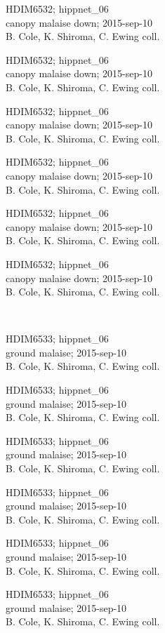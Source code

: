 \documentclass[2pt]{extarticle}
\begin{document}
\noindent
\parbox{0.16\textwidth}{\tiny \raggedright \rule[-0.3\baselineskip]{0pt}{10pt}HDIM6532; hippnet\_06\\ canopy malaise down; 2015-sep-10\\ B. Cole, K. Shiroma, C. Ewing coll.}
\parbox{0.16\textwidth}{\tiny \raggedright \rule[-0.3\baselineskip]{0pt}{10pt}HDIM6532; hippnet\_06\\ canopy malaise down; 2015-sep-10\\ B. Cole, K. Shiroma, C. Ewing coll.}
\parbox{0.16\textwidth}{\tiny \raggedright \rule[-0.3\baselineskip]{0pt}{10pt}HDIM6532; hippnet\_06\\ canopy malaise down; 2015-sep-10\\ B. Cole, K. Shiroma, C. Ewing coll.}
\parbox{0.16\textwidth}{\tiny \raggedright \rule[-0.3\baselineskip]{0pt}{10pt}HDIM6532; hippnet\_06\\ canopy malaise down; 2015-sep-10\\ B. Cole, K. Shiroma, C. Ewing coll.}
\parbox{0.16\textwidth}{\tiny \raggedright \rule[-0.3\baselineskip]{0pt}{10pt}HDIM6532; hippnet\_06\\ canopy malaise down; 2015-sep-10\\ B. Cole, K. Shiroma, C. Ewing coll.}
\parbox{0.16\textwidth}{\tiny \raggedright \rule[-0.3\baselineskip]{0pt}{10pt}HDIM6532; hippnet\_06\\ canopy malaise down; 2015-sep-10\\ B. Cole, K. Shiroma, C. Ewing coll.} \\ 
\vspace{0.001in} 

\noindent
\parbox{0.16\textwidth}{\tiny \raggedright \rule[-0.3\baselineskip]{0pt}{10pt}HDIM6533; hippnet\_06\\ ground malaise; 2015-sep-10\\ B. Cole, K. Shiroma, C. Ewing coll.}
\parbox{0.16\textwidth}{\tiny \raggedright \rule[-0.3\baselineskip]{0pt}{10pt}HDIM6533; hippnet\_06\\ ground malaise; 2015-sep-10\\ B. Cole, K. Shiroma, C. Ewing coll.}
\parbox{0.16\textwidth}{\tiny \raggedright \rule[-0.3\baselineskip]{0pt}{10pt}HDIM6533; hippnet\_06\\ ground malaise; 2015-sep-10\\ B. Cole, K. Shiroma, C. Ewing coll.}
\parbox{0.16\textwidth}{\tiny \raggedright \rule[-0.3\baselineskip]{0pt}{10pt}HDIM6533; hippnet\_06\\ ground malaise; 2015-sep-10\\ B. Cole, K. Shiroma, C. Ewing coll.}
\parbox{0.16\textwidth}{\tiny \raggedright \rule[-0.3\baselineskip]{0pt}{10pt}HDIM6533; hippnet\_06\\ ground malaise; 2015-sep-10\\ B. Cole, K. Shiroma, C. Ewing coll.}
\parbox{0.16\textwidth}{\tiny \raggedright \rule[-0.3\baselineskip]{0pt}{10pt}HDIM6533; hippnet\_06\\ ground malaise; 2015-sep-10\\ B. Cole, K. Shiroma, C. Ewing coll.} \\ 
\vspace{0.001in} 
\end{document}
